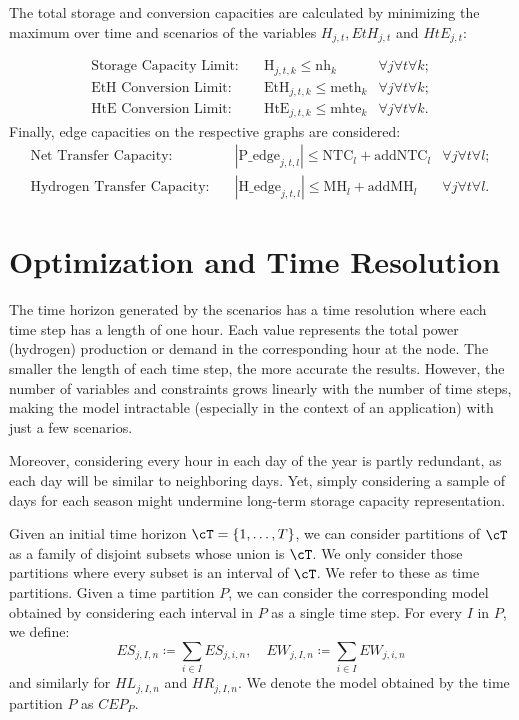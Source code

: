 \documentclass[english]{article}
\numberwithin{definition}{section}
\numberwithin{theorem}{section}
\numberwithin{problem}{section}
\begin{document}
The total storage and conversion capacities are calculated by minimizing the maximum over time and scenarios of the variables $H_{j,t}, EtH_{j,t}$ and $HtE_{j,t}$:

\begin{align*}
    \text{Storage Capacity Limit:} \quad & \text{H}_{j,t,k} \leq \text{nh}_k &\forall j\forall t\forall k;\\
    \text{EtH Conversion Limit:} \quad & \text{EtH}_{j,t,k} \leq \text{meth}_k &\forall j\forall t\forall k;\\
    \text{HtE Conversion Limit:} \quad & \text{HtE}_{j,t,k} \leq \text{mhte}_k &\forall j\forall t\forall k.
\end{align*}
Finally, edge capacities on the respective graphs are considered:
\begin{align*}
    \text{Net Transfer Capacity:} \quad & |\text{P\_edge}_{j,t,l}|\le\text{NTC}_l + \text{addNTC}_l & \forall j\forall t\forall l;\\
    \text{Hydrogen Transfer Capacity:} \quad & |\text{H\_edge}_{j,t,l}|\le\text{MH}_l + \text{addMH}_l & \forall j\forall t\forall l.
\end{align*}

\section{Optimization and Time Resolution}
The time horizon generated by the scenarios has a time resolution where each time step has a length of one hour. Each value represents the total power (hydrogen) production or demand in the corresponding hour at the node. The smaller the length of each time step, the more accurate the results. However, the number of variables and constraints grows linearly with the number of time steps, making the model intractable (especially in the context of an application) with just a few scenarios.

Moreover, considering every hour in each day of the year is partly redundant, as each day will be similar to neighboring days. Yet, simply considering a sample of days for each season might undermine long-term storage capacity representation. 

Given an initial time horizon \(\cT = \{1, \ldots, T\}\), we can consider partitions of \(\cT\) as a family of disjoint subsets whose union is \(\cT\). We only consider those partitions where every subset is an interval of \(\cT\). We refer to these as time partitions. Given a time partition \(P\), we can consider the corresponding model obtained by considering each interval in \(P\) as a single time step. For every \(I\) in \(P\), we define:
\[
ES_{j,I,n} \coloneqq \sum_{i \in I} ES_{j,i,n}, \quad EW_{j,I,n} \coloneqq \sum_{i \in I} EW_{j,i,n}
\]
and similarly for \(HL_{j,I,n}\) and \(HR_{j,I,n}\). We denote the model obtained by the time partition \(P\) as \(CEP_P\).
\end{document}
